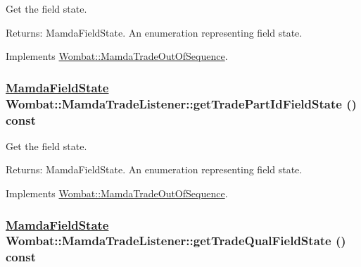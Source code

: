 Get the field state. 

\begin{Desc}
\item[Returns:]Mamda\-Field\-State. An enumeration representing field state. \end{Desc}


Implements \hyperlink{classWombat_1_1MamdaTradeOutOfSequence_de62230d558877aa0a350b8842c1d5e1}{Wombat::Mamda\-Trade\-Out\-Of\-Sequence}.\hypertarget{classWombat_1_1MamdaTradeListener_e386075d2c6a4d5f33d25e820ac81559}{
\subsubsection[getTradePartIdFieldState]{\setlength{\rightskip}{0pt plus 5cm}\hyperlink{namespaceWombat_93aac974f2ab713554fd12a1fa3b7d2a}{Mamda\-Field\-State} Wombat::Mamda\-Trade\-Listener::get\-Trade\-Part\-Id\-Field\-State () const}}
\label{classWombat_1_1MamdaTradeListener_e386075d2c6a4d5f33d25e820ac81559}


Get the field state. 

\begin{Desc}
\item[Returns:]Mamda\-Field\-State. An enumeration representing field state. \end{Desc}


Implements \hyperlink{classWombat_1_1MamdaTradeOutOfSequence_9619c7b6e64c238b0a56171bcb2442a4}{Wombat::Mamda\-Trade\-Out\-Of\-Sequence}.\hypertarget{classWombat_1_1MamdaTradeListener_958ea55776c3afa0a572b8819d9c04c8}{
\subsubsection[getTradeQualFieldState]{\setlength{\rightskip}{0pt plus 5cm}\hyperlink{namespaceWombat_93aac974f2ab713554fd12a1fa3b7d2a}{Mamda\-Field\-State} Wombat::Mamda\-Trade\-Listener::get\-Trade\-Qual\-Field\-State () const}}
\label{classWombat_1_1MamdaTradeListener_958ea55776c3afa0a572b8819d9c04c8}


